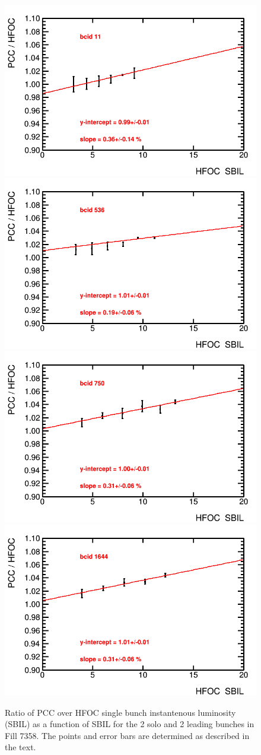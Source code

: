 \clearpage
\begin{figure}[t]
  \begin{center}
    \includegraphics[width=0.47\linewidth]{plots/sbilratios_singles/plot_det_linearity_perbx_pcc_7358_11.png}
    \includegraphics[width=0.47\linewidth]{plots/sbilratios_singles/plot_det_linearity_perbx_pcc_7358_536.png}
    \includegraphics[width=0.47\linewidth]{plots/sbilratios_singles/plot_det_linearity_perbx_pcc_7358_750.png}
    \includegraphics[width=0.47\linewidth]{plots/sbilratios_singles/plot_det_linearity_perbx_pcc_7358_1644.png}
    \caption{
      Ratio of PCC over HFOC single bunch instantenous luminosity (SBIL) as a function of SBIL for the 2 solo and 2 leading  bunches in Fill 7358.
      The points and error bars are determined as described in the text.
      \label{fig:sbilratios7358}
    }
  \end{center}
\end{figure}

